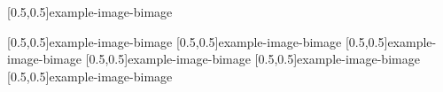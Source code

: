 



\graphicspath{{Figures/}{Figures/Iceland}}


\subtitle{Day 3}
\date{09.10.2019}


    
    
    
    [0.5,0.5]{example-image-b}{image}
    
    [0.5,0.5]{example-image-b}{image}
    [0.5,0.5]{example-image-b}{image}
    [0.5,0.5]{example-image-b}{image}
    [0.5,0.5]{example-image-b}{image}
    [0.5,0.5]{example-image-b}{image}
    [0.5,0.5]{example-image-b}{image}

